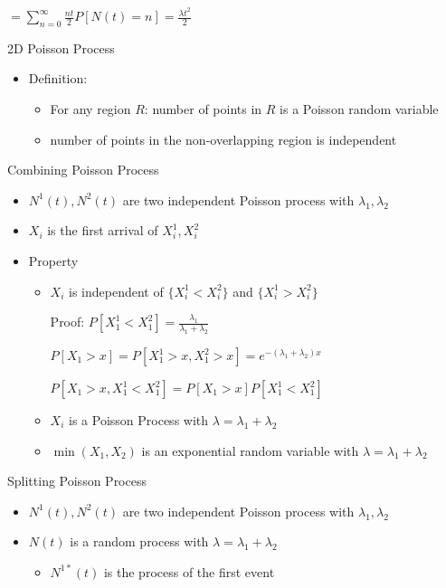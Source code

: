 \documentclass[a4paper]{article}
\begin{document}
\begin{itemize}
\begin{itemize}
\begin{itemize}
\begin{itemize}
                                $= \sum_{n = 0}^\infty \frac{nt}{2}P[N(t) = n] = \frac{\lambda t^2}{2}$
                        \end{itemize}
                \end{itemize}
                2D Poisson Process
                \begin{itemize}
                    \item Definition:
                        \begin{itemize}
                            \item For any region $R$: number of points in $R$ is a Poisson random variable
                            \item number of points in the non-overlapping region is independent
                        \end{itemize}
                \end{itemize}
                Combining Poisson Process
                \begin{itemize}
                    \item $N^1(t), N^2(t)$ are two independent Poisson process with $\lambda_1, \lambda_2$
                    \item $X_i$ is the first arrival of $X_i^1, X_i^2$
                    \item Property
                        \begin{itemize}
                            \item $X_i$ is independent of $\{X_i^1 < X_i^2\}$ and $\{X_i^1 > X_i^2\}$ 

                                Proof: $P[X_1^1 < X_1^2] = \frac{\lambda_1}{\lambda_1 + \lambda_2}$

                                $P[X_1 > x] = P[X_1^1 > x, X_1^2 > x] = e^{-(\lambda_1 + \lambda_2)x}$

                                $P[X_1 > x, X_1^1 < X_1^2] = P[X_1 > x]P[X_1^1 < X_1^2]$
                            \item $X_i$ is a Poisson Process with $\lambda = \lambda_1 + \lambda_2$
                            \item $\min(X_1, X_2)$ is an exponential random variable with $\lambda = \lambda_1 + \lambda_2$
                        \end{itemize}
                \end{itemize}
                Splitting Poisson Process
                \begin{itemize}
                    \item $N^1(t), N^2(t)$ are two independent Poisson process with $\lambda_1, \lambda_2$
                    \item $N(t)$ is a random process with $\lambda = \lambda_1 + \lambda_2$
                        \begin{itemize}
                            \item $N^{1*}(t)$ is the process of the first event


\end{itemize}
\end{itemize}
\end{itemize}
\end{itemize}
\end{document}

